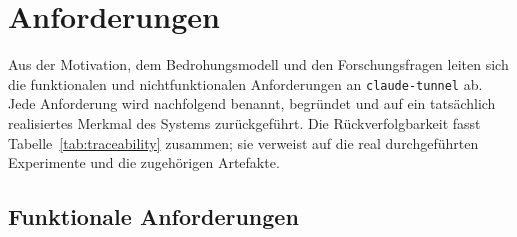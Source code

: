 \chapter{Anforderungen}\label{ch:anforderungen}

Aus der Motivation, dem Bedrohungsmodell und den Forschungsfragen leiten sich die
funktionalen und nichtfunktionalen Anforderungen an \texttt{claude-tunnel} ab. Jede
Anforderung wird nachfolgend benannt, begründet und auf ein tatsächlich realisiertes
Merkmal des Systems zurückgeführt. Die Rückverfolgbarkeit fasst
Tabelle~\ref{tab:traceability} zusammen; sie verweist auf die real durchgeführten
Experimente und die zugehörigen Artefakte.

\section{Funktionale Anforderungen}\label{sec:funktionale-anforderungen}

